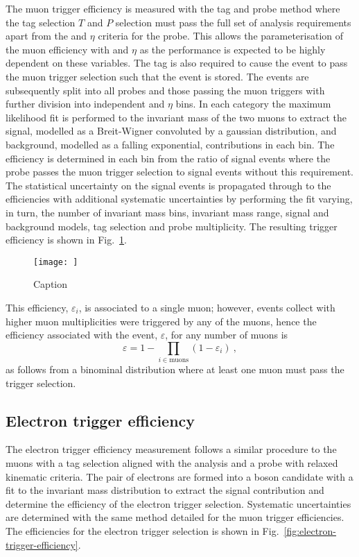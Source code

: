 The muon trigger efficiency is measured with the tag and probe method where
the tag selection $T$ and $P$ selection must pass the full set of analysis
requirements apart from the \pt and $\eta$ criteria for the probe. This allows
the parameterisation of the muon efficiency with \pt and $\eta$ as the
performance is expected to be highly dependent on these variables. The tag is
also required to cause the event to pass the muon trigger selection such that
the event is stored. The events are subsequently split into all probes and
those passing the muon triggers with further division into independent \pt and
$\eta$ bins. In each category the maximum likelihood fit is performed to the
invariant mass of the two muons to extract the signal, modelled as a
Breit-Wigner convoluted by a gaussian distribution, and background, modelled
as a falling exponential, contributions in each bin. The efficiency is
determined in each bin from the ratio of signal events where the probe passes
the muon trigger selection to signal events without this requirement. The
statistical uncertainty on the signal events is propagated through to the
efficiencies with additional systematic uncertainties by performing the fit
varying, in turn, the number of invariant mass bins, invariant mass range,
signal and background models, tag selection and probe multiplicity. The
resulting trigger efficiency is shown in Fig.~\ref{fig:muon-trigger-efficiency}.

\begin{figure}[htbp]
    \centering
    \texttt{[image: ]}
    \caption{Caption}
    \label{fig:muon-trigger-efficiency}
\end{figure}

This efficiency, $\varepsilon_i$, is associated to a single muon; however,
events collect with higher muon multiplicities were triggered by any of the
muons, hence the efficiency associated with the event, $\varepsilon$, for any
number of muons is
%
\begin{equation}
    \varepsilon = 1 - \prod_{i\in\mathrm{muons}} ( 1 - \varepsilon_i )\ ,
\end{equation}
%
as follows from a binominal distribution where at least one muon must pass the
trigger selection.


\subsection{Electron trigger efficiency}

The electron trigger efficiency measurement follows a similar procedure to the
muons with a tag selection aligned with the analysis and a probe with relaxed
kinematic criteria. The pair of electrons are formed into a \PZ boson
candidate with a fit to the invariant mass distribution to extract the signal
contribution and determine the efficiency of the electron trigger selection.
Systematic uncertainties are determined with the same method detailed for the
muon trigger efficiencies. The efficiencies for the electron trigger selection
is shown in Fig.~\ref{fig:electron-trigger-efficiency}.

